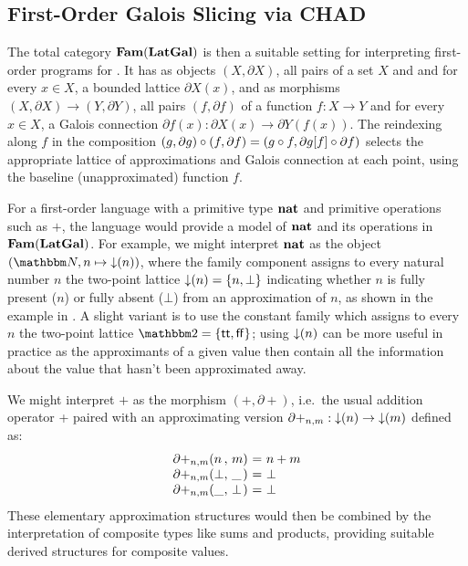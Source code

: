 \subsection{First-Order Galois Slicing via CHAD}
\label{sec:fam:galois-slicing}

The total category $\mathbf{Fam}(\mathbf{LatGal})$ is then a suitable setting for interpreting first-order programs for \GPS.
It has as objects $(X, \partial X)$, all pairs of a set $X$ and and for every $x \in X$, a bounded lattice
$\partial X(x)$, and as morphisms $(X, \partial X) \to (Y, \partial Y)$, all pairs $(f, \partial f)$ of a
function $f: X \to Y$ and for every $x \in X$, a Galois connection $\partial f(x): \partial X(x) \to \partial
Y(f(x))$. The reindexing along $f$ in the composition $(g, \partial g) \circ (f, \partial f) = (g \circ f,
\partial g[f] \circ \partial f)$ selects the appropriate lattice of approximations and Galois
connection at each point, using the baseline (unapproximated) function $f$.

For a first-order language with a primitive type $\mathbf{nat}$ and primitive operations such as $+$, the
language would provide a model of $\mathbf{nat}$ and its operations in $\mathbf{Fam}(\mathbf{LatGal})$. For example, we might
interpret $\mathbf{nat}$ as the object $(\Nat,n \mapsto \downset{n})$, where the family component assigns to
every natural number $n$ the two-point lattice $\mathop{\downarrow}(n) = \{n, \bot\}$ indicating whether $n$ is fully
present ($n$) or fully absent ($\bot$) from an approximation of $n$, as shown in the example in
. A slight variant is to use the constant family which assigns to every $n$ the two-point
lattice $\Two = \{\mathsf{tt},\mathsf{ff}\}$; using $\mathop{\downarrow}(n)$ can be more useful in practice as the
approximants of a given value then contain all the information about the value that hasn't been approximated
away.

We might interpret $+$ as the morphism $(+,\partial+)$, i.e.~the usual addition operator + paired with an
approximating version $\partial+_{n,m}: \mathop{\downarrow}(n) \to \mathop{\downarrow}(m)$ defined as:
\begin{displaymath}
    \begin{array}[t]{l@{(}l@{,~}l@{)~}c@{~}l}
      \partial+_{n,m}&n&m&=&n + m \\
      \partial+_{n,m}&\bot&\_&=&\bot \\
      \partial+_{n,m}&\_&\bot&=&\bot
    \end{array}
\end{displaymath}
These elementary approximation structures would then be combined by the interpretation of composite types like
sums and products, providing suitable derived structures for composite values.


